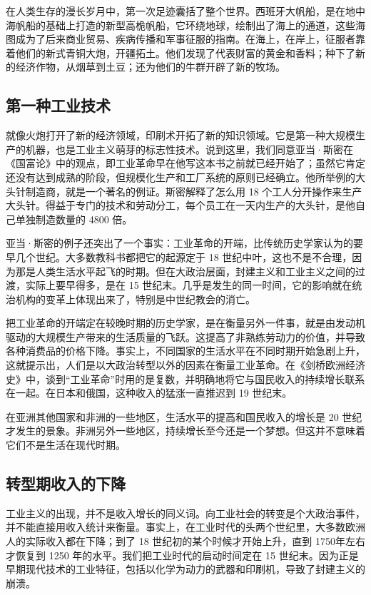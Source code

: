 在人类生存的漫长岁月中，第一次足迹囊括了整个世界。西班牙大帆船，是在地中海帆船的基础上打造的新型高桅帆船，它环绕地球，绘制出了海上的通道，这些海图成为了后来商业贸易、疾病传播和军事征服的指南。在海上，在岸上，征服者靠着他们的新式青铜大炮，开疆拓土。他们发现了代表财富的黄金和香料；种下了新的经济作物，从烟草到土豆；还为他们的牛群开辟了新的牧场。

\subsection{第一种工业技术}
就像火炮打开了新的经济领域，印刷术开拓了新的知识领域。它是第一种大规模生产的机器，也是工业主义萌芽的标志性技术。说到这里，我们同意亚当·斯密在《国富论》中的观点，即工业革命早在他写这本书之前就已经开始了；虽然它肯定还没有达到成熟的阶段，但规模化生产和工厂系统的原则已经确立。他所举例的大头针制造商，就是一个著名的例证。斯密解释了怎么用 18 个工人分开操作来生产大头针。得益于专门的技术和劳动分工，每个员工在一天内生产的大头针，是他自己单独制造数量的 4800 倍。

亚当·斯密的例子还突出了一个事实：工业革命的开端，比传统历史学家认为的要早几个世纪。大多数教科书都把它的起源定于 18 世纪中叶，这也不是不合理，因为那是人类生活水平起飞的时期。但在大政治层面，封建主义和工业主义之间的过渡，实际上要早得多，是在 15 世纪末。几乎是发生的同一时间，它的影响就在统治机构的变革上体现出来了，特别是中世纪教会的消亡。

把工业革命的开端定在较晚时期的历史学家，是在衡量另外一件事，就是由发动机驱动的大规模生产带来的生活质量的飞跃。这提高了非熟练劳动力的价值，并导致各种消费品的价格下降。事实上，不同国家的生活水平在不同时期开始急剧上升，这就提示出，人们是以大政治转型以外的因素在衡量工业革命。在《剑桥欧洲经济史》中，谈到“工业革命”时用的是复数，并明确地将它与国民收入的持续增长联系在一起。在日本和俄国，这种收入的猛涨一直推迟到 19 世纪末。

在亚洲其他国家和非洲的一些地区，生活水平的提高和国民收入的增长是 20 世纪才发生的景象。非洲另外一些地区，持续增长至今还是一个梦想。但这并不意味着它们不是生活在现代时期。

\subsection{转型期收入的下降}
工业主义的出现，并不是收入增长的同义词。向工业社会的转变是个大政治事件，并不能直接用收入统计来衡量。事实上，在工业时代的头两个世纪里，大多数欧洲人的实际收入都在下降；到了 18 世纪初的某个时候才开始上升，直到 1750年左右才恢复到 1250 年的水平。我们把工业时代的启动时间定在 15 世纪末。因为正是早期现代技术的工业特征，包括以化学为动力的武器和印刷机，导致了封建主义的崩溃。

